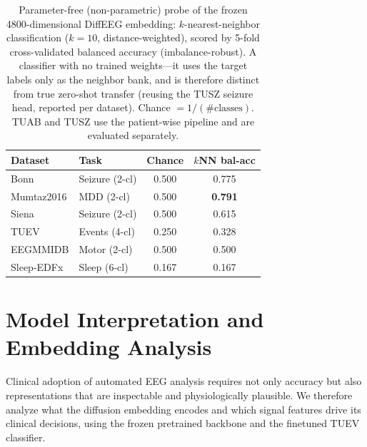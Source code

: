 \documentclass[journal]{IEEEtran}
\newcommand{\best}[1]{\textbf{#1}}
\begin{document}
\begin{table}[t]
\centering
\caption{Parameter-free (non-parametric) probe of the frozen
\num{4800}-dimensional DiffEEG embedding: $k$-nearest-neighbor classification
($k{=}10$, distance-weighted), scored by 5-fold cross-validated balanced accuracy
(imbalance-robust). A classifier with no trained weights---it uses the target
labels only as the neighbor bank, and is therefore distinct from true zero-shot
transfer (reusing the TUSZ seizure head, reported per dataset). Chance
$=1/(\text{\# classes})$. TUAB and TUSZ use the patient-wise pipeline and are
evaluated separately.}
\label{tab:knn}
\small
\begin{tabular}{@{}llcc@{}}
\toprule
Dataset & Task & Chance & $k$NN bal-acc \\
\midrule
Bonn        & Seizure (2-cl)   & 0.500 & 0.775 \\
Mumtaz2016  & MDD (2-cl)       & 0.500 & \best{0.791} \\
Siena       & Seizure (2-cl)   & 0.500 & 0.615 \\
TUEV        & Events (4-cl)    & 0.250 & 0.328 \\
EEGMMIDB    & Motor (2-cl)     & 0.500 & 0.500 \\
Sleep-EDFx  & Sleep (6-cl)     & 0.167 & 0.167 \\
\bottomrule
\end{tabular}
\end{table}

\section{Model Interpretation and Embedding Analysis}
Clinical adoption of automated EEG analysis requires not only accuracy but also
representations that are inspectable and physiologically plausible. We therefore
analyze what the diffusion embedding encodes and which signal
features drive its clinical decisions, using the frozen pretrained backbone and
the finetuned TUEV classifier.
\end{document}
